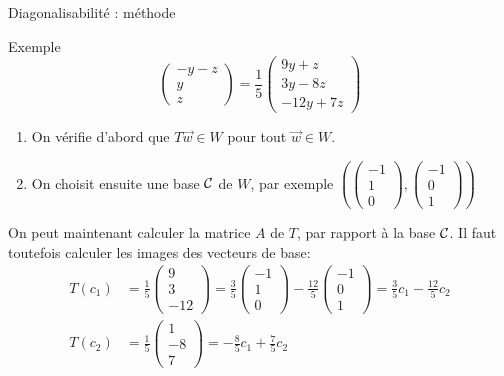 \begin{parag}{Diagonalisabilité : méthode}
\begin{subparag}{Exemple}
\[\begin{pmatrix}
            -y -z \\ y \\ z
        \end{pmatrix} = \frac{1}{5}\begin{pmatrix}
            9y + z\\
            3y -8z \\
            -12 y + 7z
        \end{pmatrix}\]
        \begin{enumerate}
            \item On vérifie d'abord que $T\vec{w} \in W$ pour tout $\vec{w} \in W$.
            \item On choisit ensuite une base $\mathcal{C}$ de $W$, par exemple
            $\left(\begin{pmatrix}
                -1 \\ 1 \\ 0
            \end{pmatrix}, \begin{pmatrix}
                -1 \\0 \\ 1
            \end{pmatrix}\right)$
        \end{enumerate}
        On peut maintenant calculer la matrice $A$ de $T$, par rapport à la base $\mathcal{C}$. Il faut toutefois calculer les images des vecteurs de base:
        \begin{align*}
            T(c_1) &= \frac{1}{5}\begin{pmatrix}
                9 \\ 3 \\ -12
            \end{pmatrix} = \frac{3}{5}\begin{pmatrix}
                -1 \\ 1 \\ 0
            \end{pmatrix} - \frac{12}{5}\begin{pmatrix}
                -1 \\ 0 \\ 1
            \end{pmatrix} = \frac{3}{5}c_1 - \frac{12}{5}c_2\\
            T(c_2) &= \frac{1}{5}\begin{pmatrix}
                1 \\ -8 \\ 7
            \end{pmatrix} = -\frac{8}{5}c_1 + \frac{7}{5}c_2

\end{align*}
\end{subparag}
\end{parag}

